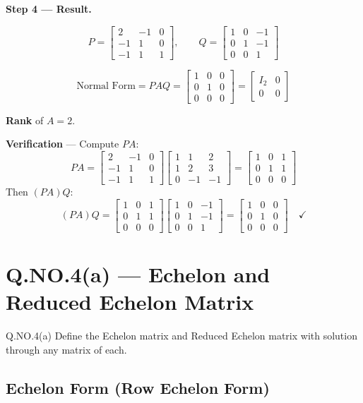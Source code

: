 \documentclass[12pt]{article}
\newcommand{\mat}[1]{\begin{bmatrix}#1\end{bmatrix}}
\begin{document}
\begin{solbox}
\textbf{Step 4 — Result.}

\[
  \boxed{P = \mat{2&-1&0\\-1&1&0\\-1&1&1}, \qquad Q = \mat{1&0&-1\\0&1&-1\\0&0&1}}
\]

\[
  \text{Normal Form} = PAQ = \mat{1&0&0\\0&1&0\\0&0&0} = \begin{bmatrix}I_2 & 0 \\ 0 & 0\end{bmatrix}
\]

\textbf{Rank} of $A = 2$.
\end{solbox}

\begin{proofbox}
\textbf{Verification} — Compute $PA$:
\[
  PA = \mat{2&-1&0\\-1&1&0\\-1&1&1}\mat{1&1&2\\1&2&3\\0&-1&-1}
     = \mat{1&0&1\\0&1&1\\0&0&0}
\]
Then $(PA)Q$:
\[
  (PA)Q = \mat{1&0&1\\0&1&1\\0&0&0}\mat{1&0&-1\\0&1&-1\\0&0&1}
        = \mat{1&0&0\\0&1&0\\0&0&0} \quad \checkmark
\]
\end{proofbox}

\newpage

\section{Q.NO.4(a) — Echelon and Reduced Echelon Matrix}

\begin{qbox}{Q.NO.4(a)}
Define the Echelon matrix and Reduced Echelon matrix with solution through any matrix of each.
\end{qbox}

\subsection{Echelon Form (Row Echelon Form)}
\end{document}
